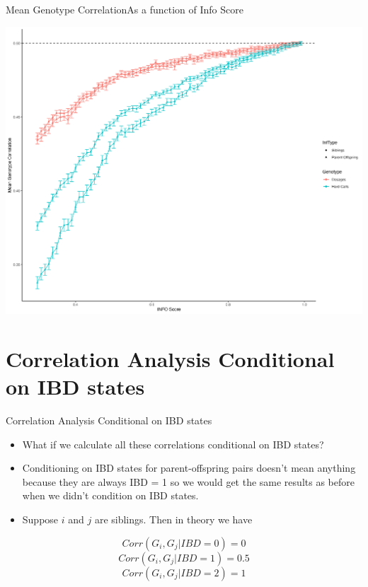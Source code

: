 \documentclass{beamer}
\begin{document}

\begin{frame}{Mean Genotype Correlation}{As a function of Info Score}

      \centering
      \includegraphics[width=.9\textwidth]{fig/mean_gt_corr_v2.png}
      
\end{frame}



\section{Correlation Analysis Conditional on IBD states}


\begin{frame}{Correlation Analysis Conditional on IBD states}
    

\begin{itemize}
    \item What if we calculate all these correlations conditional on IBD states?
    \item Conditioning on IBD states for parent-offspring pairs doesn't mean anything because they are always IBD = 1 so we would get the same results as before when we didn't condition on IBD states.
    \item Suppose \(i\) and \(j\) are siblings. Then in theory we have

\end{itemize}


\[
      Corr(G_i, G_j | IBD = 0) = 0
\]
\[
      Corr(G_i, G_j | IBD = 1) = 0.5
\] 
\[
      Corr(G_i, G_j | IBD = 2) = 1
\]


\end{frame}
\end{document}
